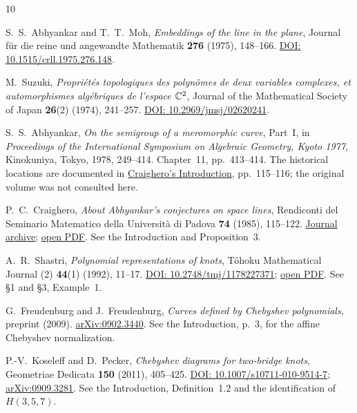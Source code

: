 \begin{thebibliography}{10}
\small
\setlength{\itemsep}{7pt}

S.~S.~Abhyankar and T.~T.~Moh,
\emph{Embeddings of the line in the plane},
Journal f\"ur die reine und angewandte Mathematik \textbf{276}
(1975), 148--166.
\href{https://doi.org/10.1515/crll.1975.276.148}{DOI: 10.1515/crll.1975.276.148}.

M.~Suzuki,
\emph{Propri\'et\'es topologiques des polyn\^omes de deux variables
complexes, et automorphismes alg\'ebriques de l'espace $\mathbb C^2$},
Journal of the Mathematical Society of Japan \textbf{26}(2)
(1974), 241--257.
\href{https://doi.org/10.2969/jmsj/02620241}{DOI: 10.2969/jmsj/02620241}.

S.~S.~Abhyankar,
\emph{On the semigroup of a meromorphic curve}, Part~I,
in \emph{Proceedings of the International Symposium on Algebraic
Geometry, Kyoto 1977}, Kinokuniya, Tokyo, 1978, 249--414.
Chapter~11, pp.~413--414.
The historical locations are documented in
\href{https://www.numdam.org/item/RSMUP_1985__74__115_0.pdf}{Craighero's
Introduction}, pp.~115--116; the original volume was not consulted here.

P.~C.~Craighero,
\emph{About Abhyankar's conjectures on space lines},
Rendiconti del Seminario Matematico della Universit\`a di Padova
\textbf{74} (1985), 115--122.
\href{https://www.numdam.org/item/RSMUP_1985__74__115_0/}{Journal archive};
\href{https://www.numdam.org/item/RSMUP_1985__74__115_0.pdf}{open PDF}.
See the Introduction and Proposition~3.

A.~R.~Shastri,
\emph{Polynomial representations of knots},
T\^ohoku Mathematical Journal (2) \textbf{44}(1) (1992), 11--17.
\href{https://doi.org/10.2748/tmj/1178227371}{DOI: 10.2748/tmj/1178227371};
\href{https://www.jstage.jst.go.jp/article/tmj1949/44/1/44_1_11/_pdf}{open PDF}.
See \S1 and \S3, Example~1.

G.~Freudenburg and J.~Freudenburg,
\emph{Curves defined by Chebyshev polynomials},
preprint (2009).
\href{https://arxiv.org/abs/0902.3440}{arXiv:0902.3440}.
See the Introduction, p.~3, for the affine Chebyshev normalization.

P.-V.~Koseleff and D.~Pecker,
\emph{Chebyshev diagrams for two-bridge knots},
Geometriae Dedicata \textbf{150} (2011), 405--425.
\href{https://doi.org/10.1007/s10711-010-9514-7}{DOI: 10.1007/s10711-010-9514-7};
\href{https://arxiv.org/abs/0909.3281}{arXiv:0909.3281}.
See the Introduction, Definition~1.2 and the identification of $H(3,5,7)$.


\end{thebibliography}
